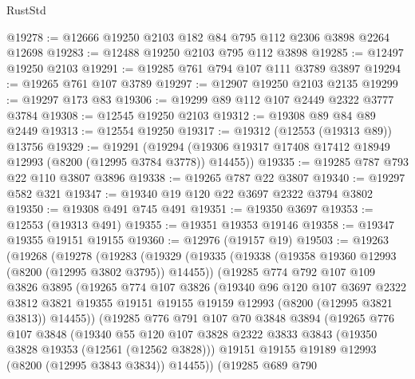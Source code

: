 \begin{lexlean}{RustStd}
\begin{coremodule}
@19278 := @12666 @19250 @2103 @182 @84 @795 @112 @2306 @3898 @2264 @12698
@19283 := @12488 @19250 @2103 @795 @112 @3898
@19285 := @12497 @19250 @2103
@19291 := @19285 @761 @794 @107 @111 @3789 @3897
@19294 := @19265 @761 @107 @3789
@19297 := @12907 @19250 @2103 @2135
@19299 := @19297 @173 @83
@19306 := @19299 @89 @112 @107 @2449 @2322 @3777 @3784
@19308 := @12545 @19250 @2103
@19312 := @19308 @89 @84 @89 @2449
@19313 := @12554 @19250
@19317 := @19312 (@12553 (@19313 @89)) @13756
@19329 := @19291
    (@19294 (@19306 @19317 @17408 @17412 @18949 @12993 (@8200 (@12995 @3784 @3778)) @14455))
@19335 := @19285 @787 @793 @22 @110 @3807 @3896
@19338 := @19265 @787 @22 @3807
@19340 := @19297 @582 @321
@19347 := @19340 @19 @120 @22 @3697 @2322 @3794 @3802
@19350 := @19308 @491 @745 @491
@19351 := @19350 @3697
@19353 := @12553 (@19313 @491)
@19355 := @19351 @19353 @19146
@19358 := @19347 @19355 @19151 @19155
@19360 := @12976 (@19157 @19)
@19503 := @19263
    (@19268
      (@19278
        (@19283
          (@19329
            (@19335
              (@19338 (@19358 @19360 @12993 (@8200 (@12995 @3802 @3795)) @14455))
              (@19285
                @774
                @792
                @107
                @109
                @3826
                @3895
                (@19265
                  @774
                  @107
                  @3826
                  (@19340
                    @96
                    @120
                    @107
                    @3697
                    @2322
                    @3812
                    @3821
                    @19355
                    @19151
                    @19155
                    @19159
                    @12993
                    (@8200 (@12995 @3821 @3813))
                    @14455))
                (@19285
                  @776
                  @791
                  @107
                  @70
                  @3848
                  @3894
                  (@19265
                    @776
                    @107
                    @3848
                    (@19340
                      @55
                      @120
                      @107
                      @3828
                      @2322
                      @3833
                      @3843
                      (@19350 @3828 @19353 (@12561 (@12562 @3828)))
                      @19151
                      @19155
                      @19189
                      @12993
                      (@8200 (@12995 @3843 @3834))
                      @14455))
                  (@19285
                    @689
                    @790

\end{coremodule}
\end{lexlean}
